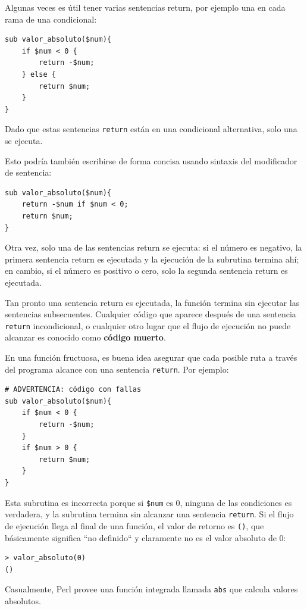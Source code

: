 Algunas veces es útil tener varias sentencias return, por 
ejemplo una en cada rama de una condicional:

\begin{verbatim}
sub valor_absoluto($num){
    if $num < 0 {
        return -$num;
    } else {
        return $num;
    }
}
\end{verbatim}
%
Dado que estas sentencias {\tt return} están en una 
condicional alternativa, solo una se ejecuta.

Esto podría también escribirse de forma concisa usando sintaxis 
del modificador de sentencia:

\begin{verbatim}
sub valor_absoluto($num){
    return -$num if $num < 0;
    return $num;
}
\end{verbatim}
%
Otra vez, solo una de las sentencias return se ejecuta: si el 
número es negativo, la primera sentencia return es ejecutada
y la ejecución de la subrutina termina ahí; en cambio, si el
número es positivo o cero, solo la segunda sentencia return 
es ejecutada.

Tan pronto una sentencia return es ejecutada, la función termina
sin ejecutar las sentencias subsecuentes. Cualquier código que aparece
después de una sentencia {\tt return} incondicional, o cualquier
otro lugar que el flujo de ejecución no puede alcanzar es 
conocido como {\bf código muerto}. 

En una función fructuosa, es buena idea asegurar que cada
posible ruta a través del programa alcance con una sentencia
{\tt return}. Por ejemplo:

\begin{verbatim}
# ADVERTENCIA: código con fallas
sub valor_absoluto($num){
    if $num < 0 {
        return -$num;
    } 
    if $num > 0 {
        return $num;
    }
}
\end{verbatim}
%

Esta subrutina es incorrecta porque si {\tt \$num} es 0, 
ninguna de las condiciones es verdadera, y la subrutina termina 
sin alcanzar una sentencia {\tt return}. Si el flujo de ejecución
llega al final de una función, el valor de retorno es {\tt ()}, que básicamente
significa ``no definido`` y claramente no es el valor absoluto de 0:

\begin{verbatim}
> valor_absoluto(0)
()
\end{verbatim}
%
Casualmente, Perl provee una función integrada
llamada {\tt abs} que calcula valores absolutos.


